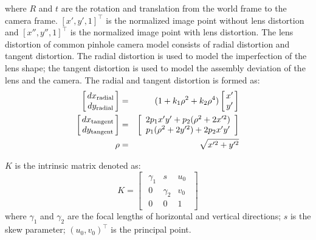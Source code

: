 \documentclass{report}
\begin{document}
where $R$ and $t$ are the rotation and translation from the world frame to the camera frame. $[x', y', 1]^\top$ is the normalized image point without lens distortion and $[x'', y'', 1]^\top$ is the normalized image point with lens distortion. The lens distortion of common pinhole camera model consists of radial distortion and tangent distortion. The radial distortion is used to model the imperfection of the lens shape; the tangent distortion is used to model the assembly deviation of the lens and the camera. The radial and tangent distortion is formed as: 
\begin{eqnarray}
\arraycolsep=1.5pt%
\begin{bmatrix}
	\begin{array}{c}
	dx_{\text{radial}} \\ dy_{\text{radial}}
	\end{array}
\end{bmatrix} 
&=&
(1 + k_1 \rho^2 + k_2 \rho^4) 
\arraycolsep=1.5pt%
\begin{bmatrix}
	\begin{array}{c}
	x' \\ y'
	\end{array}
\end{bmatrix} \\
\arraycolsep=1.5pt%
\begin{bmatrix}
	\begin{array}{c}
	dx_{\text{tangent}} \\ dy_{\text{tangent}}
	\end{array}
\end{bmatrix} 
&=&
\begin{bmatrix}
	\begin{array}{c}
	2 p_1 x' y' + p_2 (\rho^2 + 2 x'^2) \\ 
	p_1 (\rho^2 + 2 y'^2) + 2 p_2 x' y'
	\end{array}
\end{bmatrix} \\
\rho &=& \sqrt{x'^2 + y'^2}
\end{eqnarray}

$K$ is the intrinsic matrix denoted as: 
\begin{equation}
K = 
\begin{bmatrix}
	\begin{array}{ccc}
	\gamma_1 & s & u_0 \\ 
	0 & \gamma_2 & v_0 \\ 	
	0 & 0 & 1
	\end{array}
\end{bmatrix}
\label{kEqn}
\end{equation}
where $\gamma_1$ and $\gamma_2$ are the focal lengths of horizontal and vertical directions; $s$ is the skew parameter; $(u_0, v_0)^\top$ is the principal point. 
\end{document}
